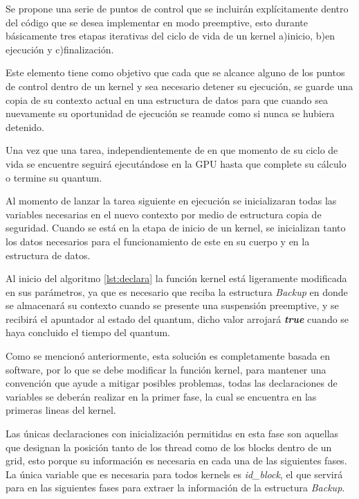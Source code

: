 Se propone una serie de puntos de control que se incluirán explícitamente dentro del código que se desea implementar en modo preemptive, esto durante básicamente tres etapas iterativas del ciclo de vida de un kernel a)inicio, b)en ejecución y c)finalización. 
\newline

Este elemento tiene como objetivo que cada que se alcance alguno de los puntos de control dentro de un kernel y sea necesario detener su ejecución, se guarde una copia de su contexto actual en una estructura de datos para que cuando sea nuevamente su oportunidad de ejecución se reanude como si nunca se hubiera detenido. 
\newline

Una vez que una tarea, independientemente de en que momento de su ciclo de vida se encuentre seguirá ejecutándose en la GPU hasta que complete su cálculo o termine su quantum.
\newline

Al momento de lanzar la tarea siguiente en ejecución se inicializaran todas las variables necesarias en el nuevo contexto por medio de estructura copia de seguridad. Cuando se está en la etapa de inicio de un kernel, se inicializan tanto los datos necesarios para el funcionamiento de este en su cuerpo y en la estructura de datos.
\newline

Al inicio del algoritmo \ref{lst:declara} la función kernel está ligeramente modificada en sus parámetros, ya que es necesario que reciba la estructura \textit{Backup} en donde se almacenará su contexto cuando se presente una suspensión preemptive, y se recibirá el apuntador al estado del quantum, dicho valor arrojará \textbf{\textit{true}} cuando se haya concluido el tiempo del quantum.
\newline

Como se mencionó anteriormente, esta solución es completamente basada en software, por lo que se debe modificar la función kernel, para mantener una convención que ayude a mitigar posibles problemas, todas las declaraciones de variables se deberán realizar en la primer fase, la cual se encuentra en las primeras lineas del kernel.
\newline

Las únicas declaraciones con inicialización permitidas en esta fase son aquellas que designan la posición tanto de los thread como de los blocks dentro de un grid, esto porque  su información es necesaria en cada una de las siguientes fases. La única variable que es necesaria para todos kernels es \textit{id\_block}, el que servirá para en las siguientes fases para extraer la información de la estructura \textit{Backup}.

